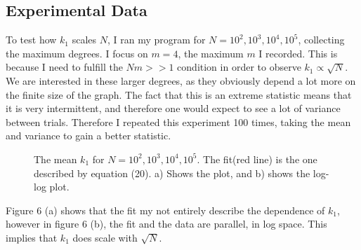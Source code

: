 \documentclass[]{article}
\begin{document}
\subsection{Experimental Data}
To test how $k_1$ scales $N$, I ran my program for $N=10^2, 10^3, 10^4, 10^5$, collecting the maximum degrees. I focus on $m=4$, the maximum $m$ I recorded. This is because I need to fulfill the  $Nm>>1$ condition in order to observe $k_1 \propto \sqrt{N}$. We are interested in these larger degrees, as they obviously depend a lot more on the finite size of the graph. The fact that this is an extreme statistic means that it is very intermittent, and therefore one would expect to see a lot of variance between trials. Therefore I repeated this experiment 100 times, taking the mean and variance to gain a better statistic. 
\begin{figure}[H]
	\caption{The mean $k_1$ for $N=10^2, 10^3, 10^4, 10^5$. The fit(red line) is the one described by equation (20). a) Shows the plot, and b) shows the log-log plot.}
\end{figure}
Figure 6 (a) shows that the fit my not entirely describe the dependence of $k_1$, however in figure 6 (b), the fit and the data are parallel, in log space. This implies that  $k_1$ does scale with $\sqrt{N}$.
\end{document}
